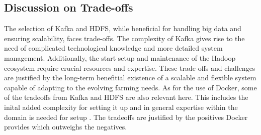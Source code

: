 \subsection{\textbf{Discussion on Trade-offs}}
The selection of Kafka and HDFS, while beneficial for handling big data and ensuring scalability, faces trade-offs. The complexity of Kafka gives rise to the need of complicated technological knowledge and more detailed system management. Additionally, the start setup and maintenance of the Hadoop ecosystem require crucial resources and expertise. These trade-offs and challenges are justified by the long-term benefitial existence of a scalable and flexible system capable of adapting to the evolving farming needs.
As for the use of Docker, some of the tradeoffs from Kafka and HDFS are also relevant here. This includes the inital added complexity for setting it up and in general expertise within the domain is needed for setup \cite{Gover_2023}. The tradeoffs are justified by the positives Docker provides which outweighs the negatives.